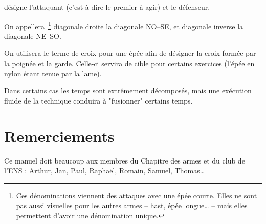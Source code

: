 \A désigne l'attaquant (c'est-à-dire le premier à agir) et \D le défenseur.

On appellera~\footnote{Ces dénominations viennent des attaques avec une épée courte. Elles ne sont pas aussi visuelles pour les autres armes – hast, épée longue… – mais elles permettent d'avoir une dénomination unique.} diagonale droite la diagonale NO–SE, et diagonale inverse la diagonale NE–SO.

On utilisera le terme de croix pour une épée afin de désigner la croix formée par la poignée et la garde.
Celle-ci servira de cible pour certains exercices (l'épée en nylon étant tenue par la lame).

Dans certains cas les temps sont extrêmement décomposés, mais une exécution fluide de la technique conduira à "fusionner" certains temps.

\section{Remerciements}

Ce manuel doit beaucoup aux membres du Chapitre des armes et du club de l'ENS : Arthur, Jan, Paul, Raphaël, Romain, Samuel, Thomas…
